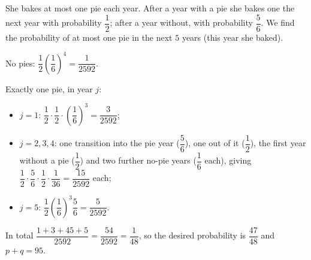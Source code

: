 She bakes at most one pie each year. After a year with a pie she bakes one the next year with probability $\dfrac12$; after a year without, with probability $\dfrac56$. We find the probability of at most one pie in the next $5$ years (this year she baked).

No pies: $\dfrac12\left(\dfrac16\right)^4=\dfrac1{2592}$.

Exactly one pie, in year $j$:
\begin{itemize}
\item $j=1$: $\dfrac12\cdot\dfrac12\cdot\left(\dfrac16\right)^3=\dfrac3{2592}$;
\item $j=2,3,4$: one transition into the pie year ($\dfrac56$), one out of it ($\dfrac12$), the first year without a pie ($\dfrac12$) and two further no-pie years ($\dfrac16$ each), giving $\dfrac12\cdot\dfrac56\cdot\dfrac12\cdot\dfrac1{36}=\dfrac{15}{2592}$ each;
\item $j=5$: $\dfrac12\left(\dfrac16\right)^3\dfrac56=\dfrac5{2592}$.
\end{itemize}
In total $\dfrac{1+3+45+5}{2592}=\dfrac{54}{2592}=\dfrac1{48}$, so the desired probability is $\dfrac{47}{48}$ and $p+q=\boxed{95}$.
